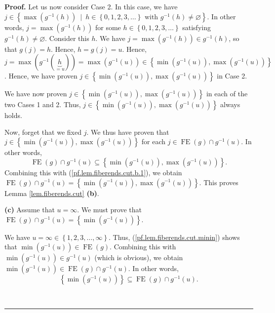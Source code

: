 \documentclass[numbers=enddot,12pt,final,onecolumn,notitlepage]{scrartcl}%
\theoremstyle{definition}
\newenvironment{proof}[1][Proof]{\noindent\textbf{#1.} }{\ \rule{0.5em}{0.5em}}
\newenvironment{verlong}{}{}
\begin{document}
\begin{verlong}
\begin{proof}
Let us now consider Case 2. In this case, we have \newline$j\in\left\{
\max\left(  g^{-1}\left(  h\right)  \right)  \ \mid\ h\in\left\{
0,1,2,3,\ldots\right\}  \text{ with }g^{-1}\left(  h\right)  \neq
\varnothing\right\}  $. In other words, $j=\max\left(  g^{-1}\left(  h\right)
\right)  $ for some $h\in\left\{  0,1,2,3,\ldots\right\}  $ satisfying
$g^{-1}\left(  h\right)  \neq\varnothing$. Consider this $h$. We have
$j=\max\left(  g^{-1}\left(  h\right)  \right)  \in g^{-1}\left(  h\right)  $,
so that $g\left(  j\right)  =h$. Hence, $h=g\left(  j\right)  =u$. Hence,
$j=\max\left(  g^{-1}\left(  \underbrace{h}_{=u}\right)  \right)  =\max\left(
g^{-1}\left(  u\right)  \right)  \in\left\{  \min\left(  g^{-1}\left(
u\right)  \right)  ,\max\left(  g^{-1}\left(  u\right)  \right)  \right\}  $.
Hence, we have proven $j\in\left\{  \min\left(  g^{-1}\left(  u\right)
\right)  ,\max\left(  g^{-1}\left(  u\right)  \right)  \right\}  $ in Case 2.

We have now proven $j\in\left\{  \min\left(  g^{-1}\left(  u\right)  \right)
,\max\left(  g^{-1}\left(  u\right)  \right)  \right\}  $ in each of the two
Cases 1 and 2. Thus, $j\in\left\{  \min\left(  g^{-1}\left(  u\right)
\right)  ,\max\left(  g^{-1}\left(  u\right)  \right)  \right\}  $ always holds.

Now, forget that we fixed $j$. We thus have proven that \newline$j\in\left\{
\min\left(  g^{-1}\left(  u\right)  \right)  ,\max\left(  g^{-1}\left(
u\right)  \right)  \right\}  $ for each $j\in\operatorname*{FE}\left(
g\right)  \cap g^{-1}\left(  u\right)  $. In other words,%
\[
\operatorname*{FE}\left(  g\right)  \cap g^{-1}\left(  u\right)
\subseteq\left\{  \min\left(  g^{-1}\left(  u\right)  \right)  ,\max\left(
g^{-1}\left(  u\right)  \right)  \right\}  .
\]
Combining this with (\ref{pf.lem.fiberends.cut.b.1}), we obtain
$\operatorname*{FE}\left(  g\right)  \cap g^{-1}\left(  u\right)  =\left\{
\min\left(  g^{-1}\left(  u\right)  \right)  ,\max\left(  g^{-1}\left(
u\right)  \right)  \right\}  $. This proves Lemma \ref{lem.fiberends.cut}
\textbf{(b)}.

\textbf{(c)} Assume that $u=\infty$. We must prove that $\operatorname*{FE}%
\left(  g\right)  \cap g^{-1}\left(  u\right)  =\left\{  \min\left(
g^{-1}\left(  u\right)  \right)  \right\}  $.

We have $u=\infty\in\left\{  1,2,3,\ldots,\infty\right\}  $. Thus,
(\ref{pf.lem.fiberends.cut.minin}) shows that $\min\left(  g^{-1}\left(
u\right)  \right)  \in\operatorname*{FE}\left(  g\right)  $. Combining this
with $\min\left(  g^{-1}\left(  u\right)  \right)  \in g^{-1}\left(  u\right)
$ (which is obvious), we obtain $\min\left(  g^{-1}\left(  u\right)  \right)
\in\operatorname*{FE}\left(  g\right)  \cap g^{-1}\left(  u\right)  $. In
other words,%
\begin{equation}
\left\{  \min\left(  g^{-1}\left(  u\right)  \right)  \right\}  \subseteq
\operatorname*{FE}\left(  g\right)  \cap g^{-1}\left(  u\right)  .
\label{pf.lem.fiberends.cut.c.1}%
\end{equation}



\end{proof}
\end{verlong}
\end{document}
